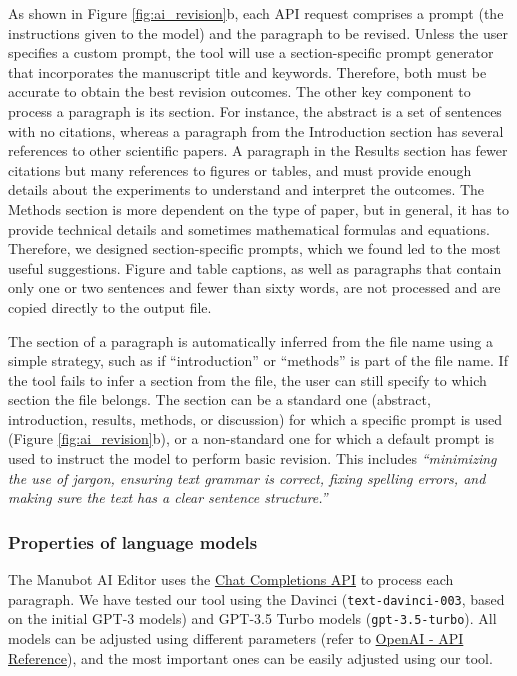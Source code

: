 \documentclass[
]{article}
\begin{document}
As shown in Figure \ref{fig:ai_revision}b, each API request comprises a prompt (the instructions given to the model) and the paragraph to be revised.
Unless the user specifies a custom prompt, the tool will use a section-specific prompt generator that incorporates the manuscript title and keywords.
Therefore, both must be accurate to obtain the best revision outcomes.
The other key component to process a paragraph is its section.
For instance, the abstract is a set of sentences with no citations, whereas a paragraph from the Introduction section has several references to other scientific papers.
A paragraph in the Results section has fewer citations but many references to figures or tables, and must provide enough details about the experiments to understand and interpret the outcomes.
The Methods section is more dependent on the type of paper, but in general, it has to provide technical details and sometimes mathematical formulas and equations.
Therefore, we designed section-specific prompts, which we found led to the most useful suggestions.
Figure and table captions, as well as paragraphs that contain only one or two sentences and fewer than sixty words, are not processed and are copied directly to the output file.

The section of a paragraph is automatically inferred from the file name using a simple strategy, such as if ``introduction'' or ``methods'' is part of the file name.
If the tool fails to infer a section from the file, the user can still specify to which section the file belongs.
The section can be a standard one (abstract, introduction, results, methods, or discussion) for which a specific prompt is used (Figure \ref{fig:ai_revision}b), or a non-standard one for which a default prompt is used to instruct the model to perform basic revision.
This includes \emph{``minimizing the use of jargon, ensuring text grammar is correct, fixing spelling errors, and making sure the text has a clear sentence structure.''}

\subsubsection{Properties of language models}

The Manubot AI Editor uses the \href{https://platform.openai.com/docs/guides/text-generation/chat-completions-api}{Chat Completions API} to process each paragraph.
We have tested our tool using the Davinci (\texttt{text-davinci-003}, based on the initial GPT-3 models) and GPT-3.5 Turbo models (\texttt{gpt-3.5-turbo}).
All models can be adjusted using different parameters (refer to \href{https://platform.openai.com/docs/api-reference/chat/create}{OpenAI - API Reference}), and the most important ones can be easily adjusted using our tool.
\end{document}
